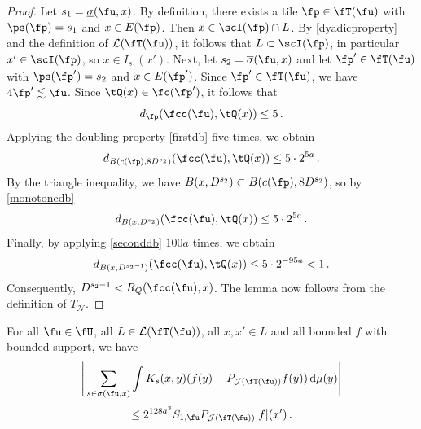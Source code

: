\begin{proof}
    \leanok
    Let $s_1 = \underline{\sigma}(\fu, x)$. By definition, there exists a tile $\fp \in \fT(\fu)$ with $\ps(\fp) = s_1$ and $x \in E(\fp)$. Then $x \in \scI(\fp) \cap L$. By \eqref{dyadicproperty} and the definition of $\mathcal{L}(\fT(\fu))$, it follows that $L \subset \scI(\fp)$, in particular $x' \in \scI(\fp)$, so $x \in I_{s_1}(x')$.
    Next, let $s_2 = \overline{\sigma}(\fu, x)$ and let $\fp' \in \fT(\fu)$ with $\ps(\fp') = s_2$ and $x \in E(\fp')$. Since $\fp' \in \fT(\fu)$, we have $4\fp' \lesssim \fu$. Since $\tQ(x) \in \fc(\fp')$, it follows that
    $$
        d_{\fp}(\fcc(\fu), \tQ(x)) \le 5\,.
    $$
    Applying the doubling property \eqref{firstdb} five times, we obtain
    $$
        d_{B(c(\fp), 8D^{s_2})}(\fcc(\fu), \tQ(x)) \le 5 \cdot 2^{5a}\,.
    $$
    By the triangle inequality, we have $B(x, D^{s_2}) \subset B(c(\fp), 8 D^{s_2})$, so by \eqref{monotonedb}
    $$
        d_{B(x, D^{s_2})}(\fcc(\fu), \tQ(x)) \le 5 \cdot 2^{5a}\,.
    $$
    Finally, by applying \eqref{seconddb} $100a$ times, we obtain
    $$
        d_{B(x, D^{s_2-1})}(\fcc(\fu), \tQ(x)) \le 5 \cdot 2^{-95a} < 1\,.
    $$
    Consequently, $D^{s_2 - 1} < R_Q(\fcc(\fu), x)$.
    The lemma now follows from the definition of $T_{\mathcal{N}}$.
\end{proof}

\begin{lemma}
    \label{third-tree-pointwise}
    \leanok
    For all $\fu \in \fU$, all $L \in \mathcal{L}(\fT(\fu))$, all $x, x' \in L$ and all bounded $f$ with bounded support, we have
    \begin{equation*}
        \Bigg| \sum_{s \in \sigma(\fu, x)} \int K_s(x,y) (f(y) - P_{\mathcal{J}(\fT(\fu))} f(y)) \, \mathrm{d}\mu(y) \Bigg|
    \end{equation*}
    \begin{equation*}
          \le 2^{128a^3} S_{1,\fu} P_{\mathcal{J}(\fT(\fu))}|f|(x')\,.
    \end{equation*}
\end{lemma}

